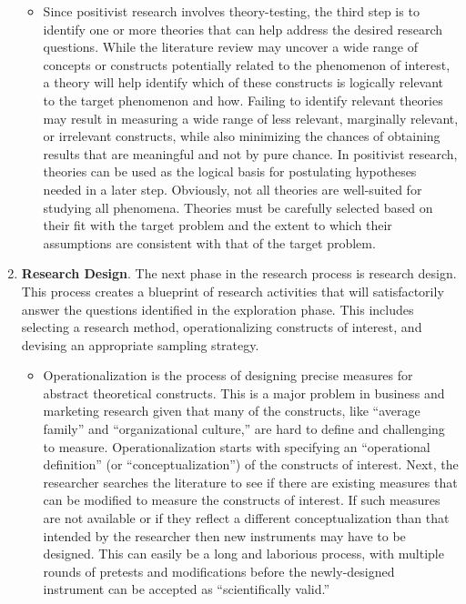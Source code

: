 \begin{enumerate}
\begin{itemize}
	\item Since positivist research involves theory-testing, the third step is to	identify one or more theories that can help address the desired research questions. While the literature review may uncover a wide range of concepts or constructs potentially related to the phenomenon of interest, a theory will help identify which of these constructs is logically relevant to the target phenomenon and how. Failing to identify relevant theories may result in measuring a wide range of less relevant, marginally relevant, or irrelevant constructs, while also minimizing the chances of obtaining results that are meaningful and not by pure chance. In positivist research, theories can be used as the logical basis for postulating hypotheses needed in a later step. Obviously, not all theories are well-suited for studying all phenomena. Theories must be carefully selected based on their fit with the target problem and the extent to which their assumptions are consistent with that of the target problem.
	
\end{itemize}

\item \textbf{Research Design}. The next phase in the research process is research design. This process creates a blueprint of research activities that will satisfactorily answer the questions identified in the exploration phase. This includes selecting a research method, operationalizing constructs of interest, and devising an appropriate sampling strategy.

\begin{itemize}
	\item Operationalization is the process of designing precise measures for abstract theoretical constructs. This is a major problem in business and marketing research given that many of the constructs, like ``average family'' and ``organizational culture,'' are hard to define and challenging to measure. Operationalization starts with specifying an ``operational definition'' (or ``conceptualization'') of the constructs of interest. Next, the researcher searches the literature to see if there are existing measures that can be modified to measure the constructs of interest. If such measures are not available or if they reflect a different conceptualization than that intended by the researcher then new instruments may have to be designed. This can easily be a long and laborious process, with multiple rounds of pretests and modifications before the newly-designed instrument can be accepted as ``scientifically valid.''
	

\end{itemize}
\end{enumerate}

